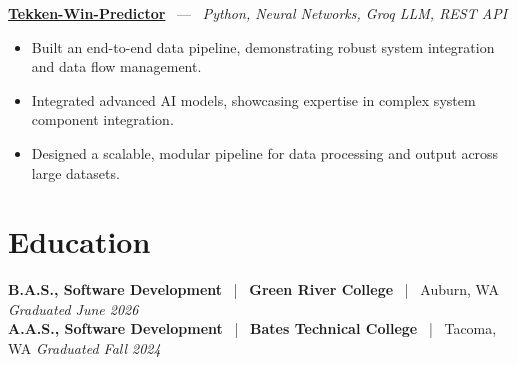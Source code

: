 \documentclass[10pt, letterpaper]{article}
\newcommand{\jobhead}[4]{%
  \vspace{5pt}%
  {\bfseries\color{dark}#1}%
  ~{\color{light}|}~%
  {\bfseries\color{navy}#2}%
  ~{\color{light}|}~%
  {\color{light}#3}%
  \hfill{\color{light}\small\textit{#4}}\\[-2pt]%
}
\newcommand{\projhead}[3]{%
  \vspace{5pt}%
  {\bfseries\color{dark}\href{#2}{#1}}%
  ~{\color{light}---}~%
  {\color{light}\small\textit{#3}}\\[-2pt]%
}
\begin{document}
\projhead{Tekken-Win-Predictor}{}{Python, Neural Networks, Groq LLM, REST API}
\begin{itemize}
  \item Built an end-to-end data pipeline, demonstrating robust system integration and data flow management.
  \item Integrated advanced AI models, showcasing expertise in complex system component integration.
  \item Designed a scalable, modular pipeline for data processing and output across large datasets.
\end{itemize}

\section{Education}

\jobhead{B.A.S., Software Development}{Green River College}{Auburn, WA}{Graduated June 2026}
\jobhead{A.A.S., Software Development}{Bates Technical College}{Tacoma, WA}{Graduated Fall 2024}
\end{document}

